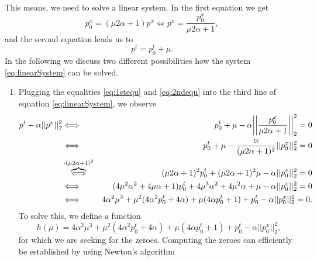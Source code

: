\documentclass{scrreprt}
\begin{document}
            This means, we need to solve a linear system. In the first equation we get
                \begin{equation}
                    p_{0}^{x} = (\mu 2 \alpha + 1) p^{x} \Longleftrightarrow p^{x} = \frac{p_{0}^{x}}{\mu 2 \alpha + 1}, \label{eq:1stequ}
                \end{equation}
            and the second equation leads us to
                \begin{equation}
                    p^{t} = p_{0}^{t} + \mu. \label{eq:2ndequ}
                \end{equation}
            In the following we discuss two different possibilities how the system \ref{eq:linearSystem} can be solved.
            \begin{enumerate}
                \item Plugging the equalities \ref{eq:1stequ} and \ref{eq:2ndequ} into the third line of equation \ref{eq:linearSystem}, we observe
                \begin{eqnarray}
                    p^{t} - \alpha||p^{x}||_{2}^{2} &\Longleftrightarrow& p_{0}^{t} + \mu - \alpha \bigg|\bigg|\frac{p_{0}^{x}}{\mu 2 \alpha + 1}\bigg|\bigg|_{2}^{2} = 0 \notag \\
                    &\Longleftrightarrow& p_{0}^{t} + \mu - \frac{\alpha}{(\mu 2 \alpha + 1)^{2}} ||p_{0}^{x}||_{2}^{2} = 0 \notag \\
                    &\overbrace{\Longleftrightarrow}^{\cdot (\mu2\alpha + 1)^{2}}& (\mu 2 \alpha + 1)^{2} p_{0}^{t} + (\mu 2 \alpha + 1)^{2} \mu - \alpha ||p_{0}^{x}||_{2}^{2} = 0 \notag \\
                    &\Longleftrightarrow& (4 \mu^{2} \alpha^{2} + 4 \mu \alpha + 1) p_{0}^{t} + 4 \mu^{3} \alpha^{2} + 4 \mu^{2} \alpha + \mu - \alpha ||p_{0}^{x}||_{2}^{2} = 0 \notag \\
                    &\Longleftrightarrow& 4 \alpha^{2} \mu^{3} + \mu^{2} (4 \alpha^{2} p_{0}^{t} + 4 \alpha) + \mu (4 \alpha p_{0}^{t} + 1) + p_{0}^{t} - \alpha ||p_{0}^{x}||_{2}^{2} = 0. \notag
                \end{eqnarray}
                To solve this, we define a function
                    $$
                        h(\mu) = 4 \alpha^{2} \mu^{3} + \mu^{2} (4 \alpha^{2} p_{0}^{t} + 4 \alpha) + \mu (4 \alpha p_{0}^{t} + 1) + p_{0}^{t} - \alpha ||p_{0}^{x}||_{2}^{2},
                    $$
                for which we are seeking for the zeroes. Computing the zeroes can efficiently be established by using Newton's algorithm

\end{enumerate}
\end{document}

